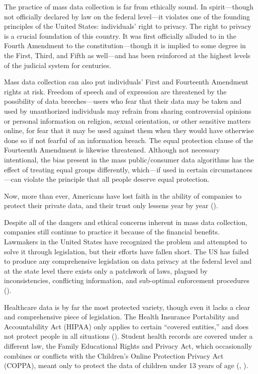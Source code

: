 \documentclass[water,article,submit,moreauthors,pdftex]{mdpi}
\begin{document}
The practice of mass data collection is far from ethically sound. In
spirit---though not officially declared by law on the federal level---it
violates one of the founding principles of the United States:
individuals' right to privacy. The right to privacy is a crucial
foundation of this country. It was first officially alluded to in the
Fourth Amendment to the constitution---though it is implied to some
degree in the First, Third, and Fifth as well---and has been reinforced
at the highest levels of the judicial system for centuries.

Mass data collection can also put individuals' First and Fourteenth
Amendment rights at risk. Freedom of speech and of expression are
threatened by the possibility of data breeches---users who fear that
their data may be taken and used by unauthorized individuals may refrain
from sharing controversial opinions or personal information on religion,
sexual orientation, or other sensitive matters online, for fear that it
may be used against them when they would have otherwise done so if not
fearful of an information breach. The equal protection clause of the
Fourteenth Amendment is likewise threatened. Although not necessary
intentional, the bias present in the mass public/consumer data
algorithms has the effect of treating equal groups differently,
which---if used in certain circumstances---can violate the principle
that all people deserve equal protection.

Now, more than ever, Americans have lost faith in the ability of
companies to protect their private data, and their trust only lessens
year by year (\citet{olmstead2017americans}).

Despite all of the dangers and ethical concerns inherent in mass data
collection, companies still continue to practice it because of the
financial benefits. Lawmakers in the United States have recognized the
problem and attempted to solve it through legislation, but their efforts
have fallen short. The US has failed to produce any comprehensive
legislation on data privacy at the federal level and at the state level
there exists only a patchwork of laws, plagued by inconsistencies,
conflicting information, and sub-optimal enforcement procedures
(\citet{cfr-reform}).

Healthcare data is by far the most protected variety, though even it
lacks a clear and comprehensive piece of legislation. The Health
Insurance Portability and Accountability Act (HIPAA) only applies to
certain ``covered entities,'' and does not protect people in all
situations (\citet{hipaa}). Student health records are covered under a
different law, the Family Educational Rights and Privacy Act, which
occasionally combines or conflicts with the Children's Online Protection
Privacy Act (COPPA), meant only to protect the data of children under 13
years of age (\citet{ferpa-coppa}, \citet{cfr-reform}).
\end{document}

